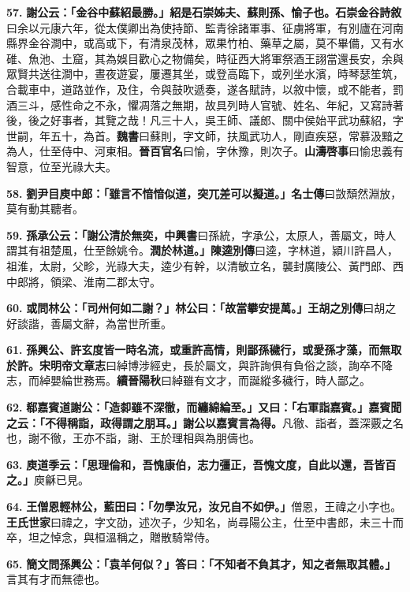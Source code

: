 \textbf{57.} \textbf{謝公云：「金谷中蘇紹最勝。」紹是石崇姊夫、蘇則孫、愉子也。}{\footnotesize \textbf{石崇金谷詩敘}曰余以元康六年，從太僕卿出為使持節、監青徐諸軍事、征虜將軍，有別廬在河南縣界金谷澗中，或高或下，有清泉茂林，眾果竹柏、藥草之屬，莫不畢備，又有水碓、魚池、土窟，其為娛目歡心之物備矣，時征西大將軍祭酒王詡當還長安，余與眾賢共送往澗中，晝夜遊宴，屢遷其坐，或登高臨下，或列坐水濱，時琴瑟笙筑，合載車中，道路並作，及住，令與鼓吹遞奏，遂各賦詩，以敘中懷，或不能者，罰酒三斗，感性命之不永，懼凋落之無期，故具列時人官號、姓名、年紀，又寫詩著後，後之好事者，其覽之哉！凡三十人，吳王師、議郎、關中侯始平武功蘇紹，字世嗣，年五十，為首。\textbf{魏書}曰蘇則，字文師，扶風武功人，剛直疾惡，常慕汲黯之為人，仕至侍中、河東相。\textbf{晉百官名}曰愉，字休豫，則次子。\textbf{山濤啓事}曰愉忠義有智意，位至光祿大夫。}

\textbf{58.} \textbf{劉尹目庾中郎：「雖言不愔愔似道，突兀差可以擬道。」}{\footnotesize \textbf{名士傳}曰敳頹然淵放，莫有動其聽者。}

\textbf{59.} \textbf{孫承公云：「謝公清於無奕，}{\footnotesize \textbf{中興書}曰孫統，字承公，太原人，善屬文，時人謂其有祖楚風，仕至餘姚令。}\textbf{潤於林道。」}{\footnotesize \textbf{陳逵別傳}曰逵，字林道，潁川許昌人，祖淮，太尉，父畛，光祿大夫，逵少有幹，以清敏立名，襲封廣陵公、黃門郎、西中郎將，領梁、淮南二郡太守。}

\textbf{60.} \textbf{或問林公：「司州何如二謝？」林公曰：「故當攀安提萬。」}{\footnotesize \textbf{王胡之別傳}曰胡之好談諧，善屬文辭，為當世所重。}

\textbf{61.} \textbf{孫興公、許玄度皆一時名流，或重許高情，則鄙孫穢行，或愛孫才藻，而無取於許。}{\footnotesize \textbf{宋明帝文章志}曰綽博涉經史，長於屬文，與許詢俱有負俗之談，詢卒不降志，而綽嬰綸世務焉。\textbf{續晉陽秋}曰綽雖有文才，而誕縱多穢行，時人鄙之。}

\textbf{62.} \textbf{郗嘉賓道謝公：「造厀雖不深徹，而纏綿綸至。」又曰：「右軍詣嘉賓。」嘉賓聞之云：「不得稱詣，政得謂之朋耳。」謝公以嘉賓言為得。}{\footnotesize 凡徹、詣者，蓋深覈之名也，謝不徹，王亦不詣，謝、王於理相與為朋儔也。}

\textbf{63.} \textbf{庾道季云：「思理倫和，吾愧康伯，志力彊正，吾愧文度，自此以還，吾皆百之。」}{\footnotesize 庾龢已見。}

\textbf{64.} \textbf{王僧恩輕林公，藍田曰：「勿學汝兄，汝兄自不如伊。」}{\footnotesize 僧恩，王禕之小字也。\textbf{王氏世家}曰禕之，字文劭，述次子，少知名，尚尋陽公主，仕至中書郎，未三十而卒，坦之悼念，與桓溫稱之，贈散騎常侍。}

\textbf{65.} \textbf{簡文問孫興公：「袁羊何似？」答曰：「不知者不負其才，知之者無取其體。」}{\footnotesize 言其有才而無德也。}

